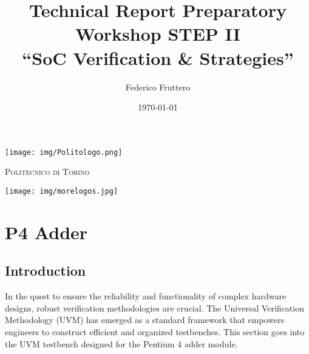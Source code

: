 \documentclass[12pt,a4paper]{report}
\title{Technical Report Preparatory Workshop STEP II\\ \textbf{``SoC Verification \& Strategies''}}
\author{Federico Fruttero}
\date{\today}
\def\university{Politecnico di Torino}
\begin{document}


\lstset{style=mystyle}


\begin{titlepage}
    \centering
    \texttt{[image: img/Politologo.png]}\par\vspace{1cm} 
    \vspace{1cm}
    {\scshape\LARGE \university\par}
    \vspace{3cm}
    \begin{minipage}{0.6\textwidth}
        \centering
        {\Huge \thetitle \par} %
        \vspace{1.5cm}
        {\Large \theauthor\par} %
    \end{minipage}
    \vfill
    {\large \thedate\par}
    \texttt{[image: img/morelogos.jpg]}\par\vspace{1cm} 
\end{titlepage}

\tableofcontents
\thispagestyle{empty}
\clearpage
\setcounter{page}{1}



\chapter{P4 Adder}
\section{Introduction}
In the quest to ensure the reliability and functionality of complex hardware designs, robust verification methodologies are crucial. The Universal Verification Methodology (UVM) has emerged as a standard framework that empowers engineers to construct efficient and organized testbenches. This section goes into the UVM testbench designed for the Pentium 4 adder module.
\end{document}
